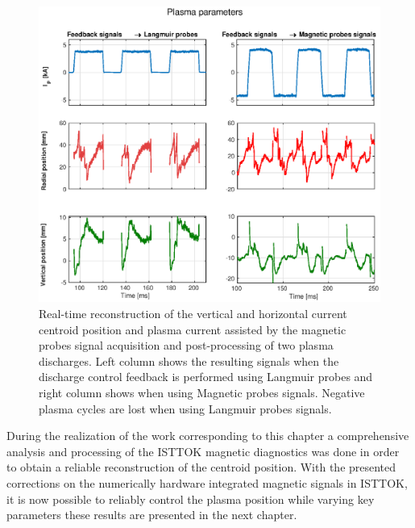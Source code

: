 \begin{figure}[h]
	\centering
	\includegraphics[width=.9\textwidth]{Chp4/Ip_R0_z0.eps}
	\caption{\label{RealTimePos}  Real-time reconstruction of the  vertical and horizontal current centroid position and plasma current  assisted by the magnetic probes signal acquisition and post-processing of two plasma discharges. Left column shows the resulting signals when the discharge control feedback is performed using Langmuir probes and right column shows when using Magnetic probes signals. Negative plasma cycles are lost when using Langmuir probes signals.    }
\end{figure}

During the realization of the work corresponding to this chapter a comprehensive analysis and processing of the ISTTOK magnetic diagnostics was done in order to obtain a reliable reconstruction of the centroid position.  With the presented corrections on the numerically hardware integrated magnetic signals in ISTTOK, it is now possible to reliably control the plasma position while varying key parameters these results are presented in the next chapter.